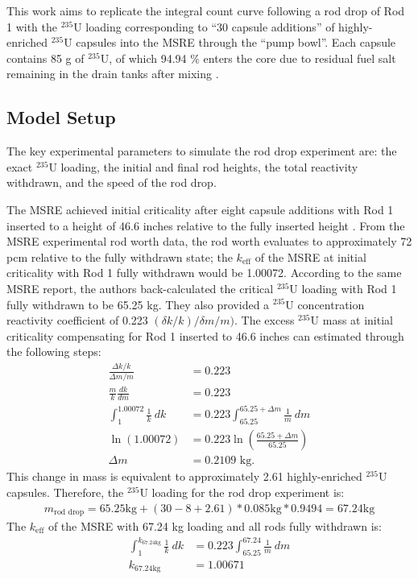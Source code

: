 This work aims to replicate the integral count curve following a rod drop of Rod 1 with the
$^{235}$U loading corresponding to ``30 capsule additions'' of highly-enriched $^{235}$U capsules
into the \gls{MSRE} through the ``pump bowl''. Each capsule contains 85 g of $^{235}$U, of which
94.94 \% enters the core
due to residual fuel salt remaining in the drain tanks after mixing \cite{fratoni_molten_2020}.

\subsection{Model Setup} \label{sec:rod-drop-setup}

The key experimental parameters to simulate the rod drop experiment are: the exact $^{235}$U
loading, the initial and final rod heights, the total reactivity withdrawn, and the speed of the
rod drop.

The \gls{MSRE} achieved initial criticality after eight capsule additions with Rod 1 inserted to a
height of 46.6 inches relative to the fully inserted height \cite{prince_zero-power_1968}.
From the \gls{MSRE} experimental rod worth
data, the rod worth evaluates to approximately 72 pcm relative to the fully withdrawn state; the
$k_\text{eff}$ of the \gls{MSRE} at initial criticality with Rod 1 fully withdrawn would be
1.00072. According to the same \gls{MSRE} report, the
authors back-calculated the critical $^{235}$U loading with Rod 1 fully withdrawn to be 65.25 kg.
They also provided a $^{235}$U concentration reactivity coefficient of 0.223 $(\delta k/k)/\delta m
/m)$. The excess $^{235}$U mass at initial criticality compensating for Rod 1 inserted to 46.6
inches can estimated through the following steps:
%
\begin{align}
  \frac{\Delta k / k}{\Delta m / m} &= 0.223 \nonumber \\
  \frac{m}{k}\frac{dk}{dm} &= 0.223 \nonumber \\
  \int^{1.00072}_1 \frac{1}{k}\ dk &= 0.223 \int^{65.25+\Delta m}_{65.25} \frac{1}{m}\ dm \nonumber \\
  \ln \left(1.00072\right) &= 0.223 \ln\left(\frac{65.25+\Delta m}{65.25}\right) \nonumber \\
  \Delta m &= 0.2109 \mbox{ kg}.
\end{align}
%
This change in mass is equivalent to approximately 2.61 highly-enriched $^{235}$U capsules.
Therefore, the $^{235}$U loading for the rod drop experiment is:
%
\begin{gather}
  m_\text{rod drop} = 65.25 \text{kg} + (30 - 8 + 2.61) * 0.085 \text{kg} * 0.9494 = 67.24 \text{kg}
\end{gather}
%
The $k_\text{eff}$ of the \gls{MSRE} with 67.24 kg loading and all rods fully withdrawn is:
%
\begin{align}
  \int^{k_{67.24 \text{kg}}}_1 \frac{1}{k}\ dk &= 0.223 \int^{67.24}_{65.25} \frac{1}{m}\ dm \nonumber \\
    k_{67.24 \text{kg}} &= 1.00671
\end{align}

